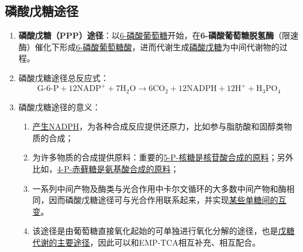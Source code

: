 \subsection{磷酸戊糖途径}
\begin{enumerate}
    \item \textbf{磷酸戊糖（PPP）途径}：以\uline{6-磷酸葡萄糖}开始，在\textbf{6-磷酸葡萄糖脱氢酶}（限速酶）催化下形成\uline{6-磷酸葡萄糖酸}，进而代谢生成\uline{磷酸戊糖}为中间代谢物的过程。
    \item 磷酸戊糖途径总反应式：
    \[
        \text{G-6-P}+12\text{NADP}^++7\text{H}_2\text{O}\to 6\text{CO}_2+12\text{NADPH}+12\text{H}^++\text{H}_3\text{PO}_4
    \]
    \item 磷酸戊糖途径的意义：
    \begin{enumerate}
        \item \uline{产生NADPH}，为各种合成反应提供还原力，比如参与脂肪酸和固醇类物质的合成；
        \item 为许多物质的合成提供原料：重要的\uline{5-P-核糖是核苷酸合成的原料}；另外比如，\uline{4-P-赤藓糖是氨基酸合成的原料}；
        \item 一系列中间产物及酶类与光合作用中卡尔文循环的大多数中间产物和酶相同，因而磷酸戊糖途径可与光合作用联系起来，并实现\uline{某些单糖间的互变}。
        \item 该途径是由葡萄糖直接氧化起始的可单独进行氧化分解的途径，也是\uline{戊糖代谢的主要途径}，因此可以和EMP-TCA相互补充、相互配合。
    \end{enumerate}
\end{enumerate}

